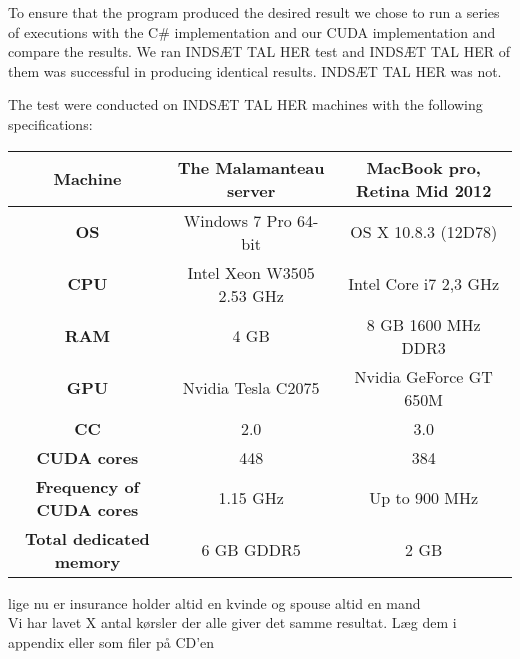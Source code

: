 To ensure that the program produced the desired result we chose to run a series of executions with the C\# implementation and our CUDA implementation and compare the results. We ran INDSÆT TAL HER test and INDSÆT TAL HER of them was successful in producing identical results. INDSÆT TAL HER was not. 

The test were conducted on INDSÆT TAL HER machines with the following specifications:

\begin{center}
\begin{tabular}{|c|c|c|}
	\hline
	\multicolumn{1}{|m{2.8cm}|}{\centering \textbf{Machine}} & The Malamanteau server & MacBook pro, Retina Mid 2012 \\ \hline
	\multicolumn{1}{|m{2.8cm}|}{\centering \textbf{OS}} & Windows 7 Pro 64-bit & OS X 10.8.3 (12D78)\\ \hline
	\multicolumn{1}{|m{2.8cm}|}{\centering \textbf{CPU}} & Intel Xeon W3505 2.53 GHz & Intel Core i7 2,3 GHz \\ \hline
	\multicolumn{1}{|m{2.8cm}|}{\centering \textbf{RAM}} & 4 GB & 8 GB 1600 MHz DDR3\\ \hline
	\multicolumn{1}{|m{2.8cm}|}{\centering \textbf{GPU}} & Nvidia Tesla C2075\cite{tesl} & Nvidia GeForce GT 650M \cite{kepl}\\ \hline
	\multicolumn{1}{|m{2.8cm}|}{\centering \textbf{CC}} & 2.0 & 3.0\\ \hline
	\multicolumn{1}{|m{2.8cm}|}{\centering \textbf{CUDA cores}} & 448 & 384\\ \hline
	\multicolumn{1}{|m{2.8cm}|}{\centering \textbf{Frequency of CUDA cores}} & 1.15 GHz & Up to 900 MHz\\ \hline
	\multicolumn{1}{|m{2.8cm}|}{\centering \textbf{Total dedicated memory}} & 6 GB GDDR5 & 2 GB\\ \hline
\end{tabular}
\end{center}

lige nu er insurance holder altid en kvinde og spouse altid en mand \\

Vi har lavet X antal kørsler der alle giver det samme resultat. Læg dem i appendix eller som filer på CD'en

